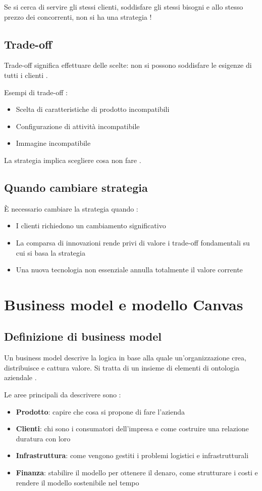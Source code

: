 \documentclass[12pt,a4paper]{article}
\begin{document}
Se si cerca di servire gli stessi clienti, soddisfare gli stessi bisogni e allo stesso prezzo dei concorrenti, non si ha una strategia !

\subsection{Trade-off}
Trade-off significa effettuare delle scelte: non si possono soddisfare le esigenze di tutti i clienti .

Esempi di trade-off :
\begin{itemize}
    \item Scelta di caratteristiche di prodotto incompatibili
    \item Configurazione di attività incompatibile
    \item Immagine incompatibile
\end{itemize}

La strategia implica scegliere cosa non fare .

\subsection{Quando cambiare strategia}
È necessario cambiare la strategia quando :
\begin{itemize}
    \item I clienti richiedono un cambiamento significativo
    \item La comparsa di innovazioni rende privi di valore i trade-off fondamentali su cui si basa la strategia
    \item Una nuova tecnologia non essenziale annulla totalmente il valore corrente
\end{itemize}

\section{Business model e modello Canvas}

\subsection{Definizione di business model}
Un business model descrive la logica in base alla quale un'organizzazione crea, distribuisce e cattura valore. Si tratta di un insieme di elementi di ontologia aziendale .

Le aree principali da descrivere sono :
\begin{itemize}
    \item \textbf{Prodotto}: capire che cosa si propone di fare l'azienda
    \item \textbf{Clienti}: chi sono i consumatori dell'impresa e come costruire una relazione duratura con loro
    \item \textbf{Infrastruttura}: come vengono gestiti i problemi logistici e infrastrutturali
    \item \textbf{Finanza}: stabilire il modello per ottenere il denaro, come strutturare i costi e rendere il modello sostenibile nel tempo
\end{itemize}
\end{document}
